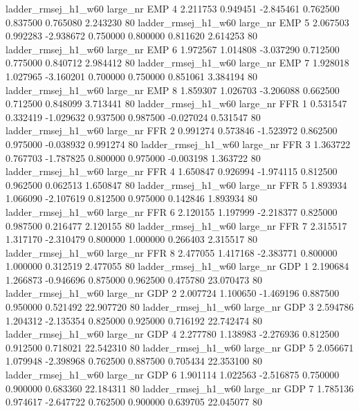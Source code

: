ladder_rmsej_h1_w60   large_nr      EMP                 4  2.211753  0.949451  -2.845461 0.762500 0.837500  0.765080    2.243230 80
ladder_rmsej_h1_w60   large_nr      EMP                 5  2.067503  0.992283  -2.938672 0.750000 0.800000  0.811620    2.614253 80
ladder_rmsej_h1_w60   large_nr      EMP                 6  1.972567  1.014808  -3.037290 0.712500 0.775000  0.840712    2.984412 80
ladder_rmsej_h1_w60   large_nr      EMP                 7  1.928018  1.027965  -3.160201 0.700000 0.750000  0.851061    3.384194 80
ladder_rmsej_h1_w60   large_nr      EMP                 8  1.859307  1.026703  -3.206088 0.662500 0.712500  0.848099    3.713441 80
ladder_rmsej_h1_w60   large_nr      FFR                 1  0.531547  0.332419  -1.029632 0.937500 0.987500 -0.027024    0.531547 80
ladder_rmsej_h1_w60   large_nr      FFR                 2  0.991274  0.573846  -1.523972 0.862500 0.975000 -0.038932    0.991274 80
ladder_rmsej_h1_w60   large_nr      FFR                 3  1.363722  0.767703  -1.787825 0.800000 0.975000 -0.003198    1.363722 80
ladder_rmsej_h1_w60   large_nr      FFR                 4  1.650847  0.926994  -1.974115 0.812500 0.962500  0.062513    1.650847 80
ladder_rmsej_h1_w60   large_nr      FFR                 5  1.893934  1.066090  -2.107619 0.812500 0.975000  0.142846    1.893934 80
ladder_rmsej_h1_w60   large_nr      FFR                 6  2.120155  1.197999  -2.218377 0.825000 0.987500  0.216477    2.120155 80
ladder_rmsej_h1_w60   large_nr      FFR                 7  2.315517  1.317170  -2.310479 0.800000 1.000000  0.266403    2.315517 80
ladder_rmsej_h1_w60   large_nr      FFR                 8  2.477055  1.417168  -2.383771 0.800000 1.000000  0.312519    2.477055 80
ladder_rmsej_h1_w60   large_nr      GDP                 1  2.190684  1.266873  -0.946696 0.875000 0.962500  0.475780   23.070473 80
ladder_rmsej_h1_w60   large_nr      GDP                 2  2.007724  1.100650  -1.469196 0.887500 0.950000  0.521492   22.907720 80
ladder_rmsej_h1_w60   large_nr      GDP                 3  2.594786  1.204312  -2.135354 0.825000 0.925000  0.716192   22.742474 80
ladder_rmsej_h1_w60   large_nr      GDP                 4  2.277780  1.138983  -2.276936 0.812500 0.912500  0.718021   22.542310 80
ladder_rmsej_h1_w60   large_nr      GDP                 5  2.056671  1.079948  -2.398968 0.762500 0.887500  0.705434   22.353100 80
ladder_rmsej_h1_w60   large_nr      GDP                 6  1.901114  1.022563  -2.516875 0.750000 0.900000  0.683360   22.184311 80
ladder_rmsej_h1_w60   large_nr      GDP                 7  1.785136  0.974617  -2.647722 0.762500 0.900000  0.639705   22.045077 80
